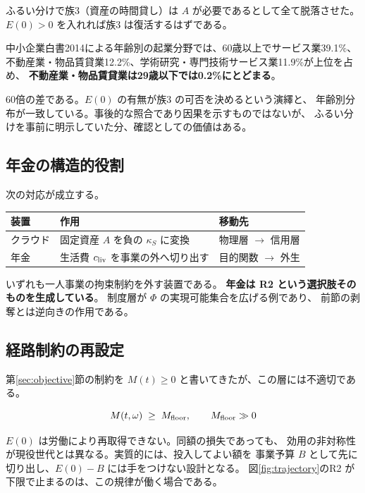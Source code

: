 ふるい分けで族3（資産の時間貸し）は $A$ が必要であるとして全て脱落させた。
$E(0)>0$ を入れれば族3 は復活するはずである。

中小企業白書2014による年齢別の起業分野では、60歳以上でサービス業39.1\%、
不動産業・物品賃貸業12.2\%、学術研究・専門技術サービス業11.9\%が上位を占め、
\textbf{不動産業・物品賃貸業は29歳以下では0.2\%にとどまる}。

60倍の差である。$E(0)$ の有無が族3 の可否を決めるという演繹と、
年齢別分布が一致している。事後的な照合であり因果を示すものではないが、
ふるい分けを事前に明示していた分、確認としての価値はある。

\subsection{年金の構造的役割}

次の対応が成立する。

\begin{center}
\begin{tabularx}{\textwidth}{@{}lXl@{}}
\toprule
装置 & 作用 & 移動先 \\
\midrule
クラウド & 固定資産 $A$ を負の $\kappa_S$ に変換 & 物理層 $\to$ 信用層 \\
年金 & 生活費 $c_{\rm liv}$ を事業の外へ切り出す & 目的関数 $\to$ 外生 \\
\bottomrule
\end{tabularx}
\label{tab:solo-constraint-relief}
\end{center}

いずれも一人事業の拘束制約を外す装置である。
\textbf{年金は R2 という選択肢そのものを生成している}。
制度層が $\Phi$ の実現可能集合を広げる例であり、
前節の剥奪とは逆向きの作用である。

\subsection{経路制約の再設定}

第\ref{sec:objective}節の制約を $M(t)\geq 0$ と書いてきたが、この層には不適切である。

\begin{equation}
M(t,\omega) \;\geq\; M_{\rm floor}, \qquad M_{\rm floor} \gg 0
\end{equation}

$E(0)$ は労働により再取得できない。同額の損失であっても、
効用の非対称性が現役世代とは異なる。実質的には、投入してよい額を
事業予算 $B$ として先に切り出し、$E(0)-B$ には手をつけない設計となる。
図\ref{fig:trajectory}のR2 が下限で止まるのは、この規律が働く場合である。

